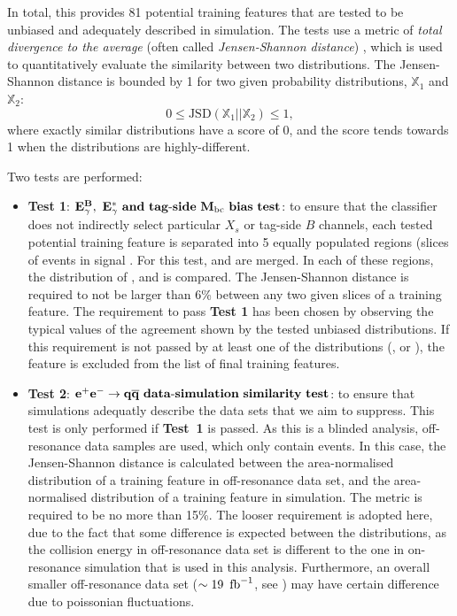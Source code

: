 In total, this provides 81 potential training features that are tested to be unbiased and adequately described in simulation.
The tests use a metric of \textit{total divergence to the average} (often called \textit{Jensen-Shannon distance}) \cite{Lin:1991abc},
which is used to quantitatively evaluate the similarity between two distributions.
The Jensen-Shannon distance is bounded by 1 for two given probability distributions, $\mathbb{X}_1$ and $\mathbb{X}_2$:
\begin{equation}\label{eq:js_distance}
    0\leq\mathrm{JSD}(\mathbb{X}_1||\mathbb{X}_2) \leq1,
\end{equation}
where exactly similar distributions have a score of 0, and the score tends towards 1 when the distributions are highly-different.

Two tests are performed:
\begin{itemize}
    \item \textbf{Test 1}: $\mathbf{{E^B_{\gamma}},~{E^*_{\gamma}}~and~tag\mbox{-}side~{M_{\mathrm{bc}}}~bias~test}$:
    to ensure that the classifier does not indirectly select particular $X_s$ or tag-side $B$ channels,
    each tested potential training feature is separated into 5 equally populated regions (\texorpdfstring{slices}) of \BtoXsgamma events in signal \MC.
    For this test, \BptoXsgamma and \BztoXsgamma are merged.
    In each of these regions, the distribution of \EB, \Estar and \Mbc is compared.
    The Jensen-Shannon distance is required to not be larger than 6\% between any two given slices of a training feature.
    The requirement to pass \textbf{Test 1} has been chosen by observing the typical values of the agreement shown by the tested unbiased distributions.
    If this requirement is not passed by at least one of the distributions (\EB, \Estar or \Mbc), the feature is excluded from the list of final \BDT training features.
    \item \textbf{Test 2}: $\mathbf{e^+e^-\rightarrow q\overline q~data\mbox{-}simulation~similarity~test}$:
    to ensure that simulations adequatly describe the data sets that we aim to suppress.
    This test is only performed if \textbf{Test~1} is passed.
    As this is a blinded analysis, off-resonance data samples are used, which only contain \epem\ra\qqbar events.
    In this case, the Jensen-Shannon distance is calculated between 
    the area-normalised distribution of a training feature in off-resonance data set,
    and the area-normalised distribution of a training feature in \epem\ra\qqbar simulation.
    The metric is required to be no more than 15\%.
    The looser requirement is adopted here, due to the fact that some difference is expected between the distributions,
    as the collision energy in off-resonance data set is different to the one in on-resonance simulation that is used in this analysis.
    Furthermore, an overall smaller off-resonance data set ($\sim19~\mbox{\,fb}^{-1}$, see ) may have certain difference due to poissonian fluctuations.
\end{itemize}

